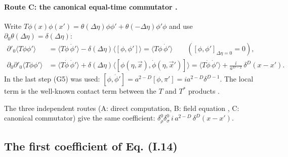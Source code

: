 \paragraph{Route C: the canonical equal-time commutator \tD.}
Write $T\phi(x)\phi(x')=\theta(\Delta\eta)\phi\phi'+\theta(-\Delta\eta)\phi'\phi$ and use $\partial_0\theta(\Delta\eta)=\delta(\Delta\eta)$:
\begin{equation}
\begin{aligned}
\partial'_0\langle T\phi\phi'\rangle&=\langle T\phi\,\dot\phi'\rangle-\delta(\Delta\eta)\langle[\phi,\phi']\rangle=\langle T\phi\,\dot\phi'\rangle\qquad([\phi,\phi']_{\Delta\eta=0}=0),\\
\partial_0\partial'_0\langle T\phi\phi'\rangle&=\langle T\dot\phi\,\dot\phi'\rangle+\delta(\Delta\eta)\langle[\phi(\eta,\vec x),\dot\phi(\eta,\vec x')]\rangle=\langle T\dot\phi\,\dot\phi'\rangle+\frac{i}{a^{D-2}}\,\delta^D(x-x').
\end{aligned}
\label{eq:ch3-routeC}
\end{equation}
In the last step (G5) was used: $[\phi,\dot\phi']=a^{2-D}[\phi,\pi']=ia^{2-D}\delta^{D-1}$. The local term is the well-known contact term between the $T$ and $T^*$ products \chIIIok.

\begin{resultbox}
The three independent routes (A: direct computation, B: field equation , C: canonical commutator) give the same coefficient:
$\delta^0_\rho\delta^0_\sigma\,i\,a^{2-D}\,\delta^D(x-x')$.
\end{resultbox}

\subsection{The first coefficient of Eq. (I.14) \tD\,\tC}
\label{sec:ch3-c0}

